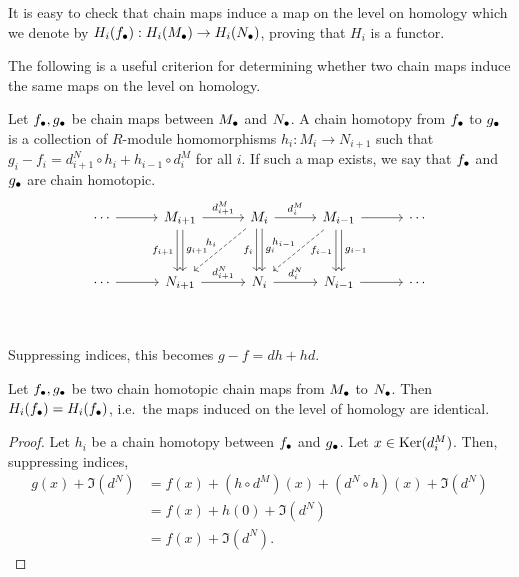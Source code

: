 It is easy to check that chain maps induce a map on the level on homology which we denote by $H_i(f_\bullet): H_i(M_\bullet) \to  H_i(N_\bullet)$, proving that $H_i$ is a functor. 

The following is a useful criterion for determining whether two chain maps induce the same maps on the level on homology.
\begin{definition}
    Let $f_\bullet, g_\bullet$ be chain maps between  $M_\bullet$ and $N_\bullet$.
    A chain homotopy from  $f_\bullet$ to  $g_\bullet$ is a collection of  $R$-module homomorphisms $h_i: M_i \to  N_{i+1}$ such that $g_i - f_i = d^{N}_{i+1}  \circ  h_i + h_{i-1}  \circ  d_i^{M}$ for all $i$.
    If such a map exists, we say that $f_\bullet$ and  $g_\bullet$ are chain homotopic.
    \[
        \begin{tikzcd}[column sep=3em, row sep=3em]
            \cdots  \arrow[r, ""]&
            M_{i+1} \arrow[r, "d_{i+1}^{M}"] \arrow[d, "f_{i+1}"', shift right=2pt] \arrow[d, "g_{i+1}", shift left=2pt]&
            M_{i} \arrow[r, "d_{i}^{M}"] \arrow[d, "f_i"', shift right=2pt] \arrow[d, "g_{i}", shift left=2pt] \arrow[dl, "h_i"', dashed]&
            M_{i-1} \arrow[r, ""] \arrow[d, "f_{i-1}"', shift right=2pt]\arrow[d, "g_{i-1}", shift left=2pt] \arrow[dl, "h_{i-1}"', dashed]&
            \cdots \\
            \cdots  \arrow[r, ""]&
            N_{i+1} \arrow[r, "d_{i+1}^{N}"] &
            N_{i} \arrow[r, "d_{i}^{N}"] &
            N_{i-1} \arrow[r, ""] &
            \cdots \\
        \end{tikzcd}
    \]
    Suppressing indices, this becomes $g - f = dh + hd$.
\end{definition}
\begin{prop}
    Let $f_\bullet, g_\bullet$ be two chain homotopic chain maps from $M_\bullet$ to $N_\bullet$. 
    Then $H_i(f_\bullet) = H_i(f_\bullet)$, i.e.\ the maps induced on the level of homology are identical.
\end{prop}
\begin{proof}
    Let $h_i$ be a chain homotopy between  $f_\bullet$ and  $g_\bullet$.
    Let $x \in \operatorname{Ker}(d_i^{M})$.
    Then, suppressing indices,
    \begin{align*}
        g(x) + \Im(d^{N}) &= f(x) + (h  \circ  d^{M})(x) + (d^{N}  \circ h)(x)  + \Im(d^{N})\\
                          &= f(x) + h(0) + \Im(d^{N})\\
                        &= f(x) + \Im(d^{N}).
    \end{align*} 
\end{proof}

